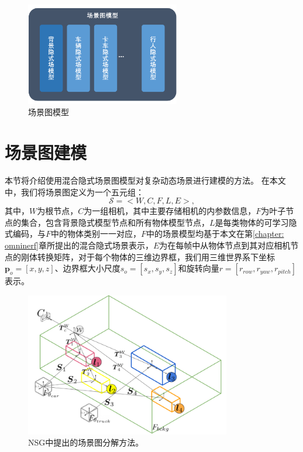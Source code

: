 \begin{figure}[ht]
    \centering
    \includegraphics[width=0.6\textwidth]{undergraduate-thesis/images/scene-graph.pdf}
    \caption{场景图模型}
    \label{fig:scene-graph model}
\end{figure}

\section{场景图建模}

本节将介绍使用混合隐式场景图模型对复杂动态场景进行建模的方法。 在本文中，我们将场景图定义为一个五元组\cite{ost_neural_2021}：
\begin{equation}
    \mathcal{S} = <W, C, F, L, E>,
\end{equation}
其中，$W$为根节点，$C$为一组相机，其中主要存储相机的内参数信息，$F$为叶子节点的集合，包含背景隐式模型节点和所有物体模型节点，$L$是每类物体的可学习隐式编码，与$F$中的物体类别一一对应，$F$中的场景模型均基于本文在第\ref{chapter: omninerf}章所提出的混合隐式场景表示，$E$为在每帧中从物体节点到其对应相机节点的刚体转换矩阵，对于每个物体的三维边界框，我们用三维世界系下坐标$\mathbf{p}_o = [x, y, z]$、边界框大小尺度$s_o = [s_x, s_y, s_z]$和旋转向量$r = [r_{row}, r_{yaw}, r_{pitch}]$表示。

\begin{figure}[ht]
    \centering
    \includegraphics[width=0.8\textwidth]{undergraduate-thesis/images/nsg-scene-graph visualization.png}
    \caption{NSG\cite{ost_neural_2021}中提出的场景图分解方法。}
    \label{fig:NSG scene graph}
\end{figure}

